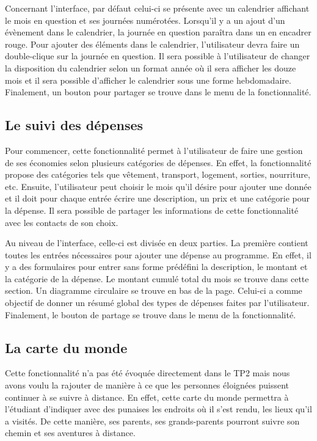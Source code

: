 \documentclass[11pt]{article}
\begin{document}
Concernant l’interface, par défaut  celui-ci se présente avec un calendrier affichant le mois en question et ses journées numérotées. Lorsqu’il y a  un ajout d’un évènement dans le calendrier, la journée en question paraîtra dans un en encadrer rouge. Pour ajouter des éléments dans le calendrier, l’utilisateur devra faire un double-clique sur la journée en question. Il sera possible à l’utilisateur de changer la disposition du calendrier selon un format année où il sera afficher les douze mois et il sera possible d’afficher le calendrier sous une forme hebdomadaire. Finalement, un bouton pour partager se trouve dans le menu de la fonctionnalité.
\subsection{Le suivi des dépenses}\label{par:depenses}
Pour commencer, cette fonctionnalité permet à l’utilisateur de faire une gestion de ses économies selon plusieurs catégories de dépenses. En effet, la fonctionnalité propose des catégories tels que vêtement, transport, logement, sorties, nourriture, etc. Ensuite, l’utilisateur peut choisir le mois qu'il désire pour ajouter une donnée et il doit pour chaque entrée écrire une description, un prix et une catégorie pour la dépense. Il sera possible de partager les informations de cette fonctionnalité avec les contacts de son choix.

Au niveau de l’interface, celle-ci est divisée en deux parties. La première contient toutes les entrées nécessaires pour ajouter une dépense au programme. En effet, il y a des formulaires pour entrer sans forme prédéfini la description, le montant et la catégorie de la dépense. Le montant cumulé total du mois se trouve dans cette section. Un diagramme circulaire se trouve en bas de la page. Celui-ci a comme objectif de donner un résumé global des types de dépenses faites par l’utilisateur. Finalement, le bouton de partage se trouve dans le  menu de la fonctionnalité.
\subsection{La carte du monde}\label{par:carte}
Cette fonctionnalité n'a pas été évoquée directement dans le TP2 mais nous avons voulu la rajouter de manière à ce que les personnes éloignées puissent continuer à se suivre à distance. En effet, cette carte du monde permettra à l'étudiant d'indiquer avec des punaises les endroits où il s'est rendu, les lieux qu'il a visités. De cette manière, ses parents, ses grands-parents pourront suivre son chemin et ses aventures à distance. 
\end{document}
